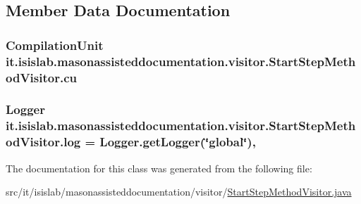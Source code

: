 \subsection{Member Data Documentation}
\hypertarget{classit_1_1isislab_1_1masonassisteddocumentation_1_1visitor_1_1_start_step_method_visitor_a0bfe5ac0a34decfd8a1cc74dab7afea4}{
\subsubsection[{cu}]{\setlength{\rightskip}{0pt plus 5cm}Compilation\-Unit it.\-isislab.\-masonassisteddocumentation.\-visitor.\-Start\-Step\-Method\-Visitor.\-cu\hspace{0.3cm}{\ttfamily [private]}}}\label{classit_1_1isislab_1_1masonassisteddocumentation_1_1visitor_1_1_start_step_method_visitor_a0bfe5ac0a34decfd8a1cc74dab7afea4}
\hypertarget{classit_1_1isislab_1_1masonassisteddocumentation_1_1visitor_1_1_start_step_method_visitor_a88856071314f2d6013246fd85e8a7ca9}{
\subsubsection[{log}]{\setlength{\rightskip}{0pt plus 5cm}Logger it.\-isislab.\-masonassisteddocumentation.\-visitor.\-Start\-Step\-Method\-Visitor.\-log = Logger.\-get\-Logger(\char`\"{}global\char`\"{})\hspace{0.3cm}{\ttfamily [static]}, {\ttfamily [private]}}}\label{classit_1_1isislab_1_1masonassisteddocumentation_1_1visitor_1_1_start_step_method_visitor_a88856071314f2d6013246fd85e8a7ca9}


The documentation for this class was generated from the following file\-:\begin{DoxyCompactItemize}
\item 
src/it/isislab/masonassisteddocumentation/visitor/\hyperlink{_start_step_method_visitor_8java}{Start\-Step\-Method\-Visitor.\-java}\end{DoxyCompactItemize}
